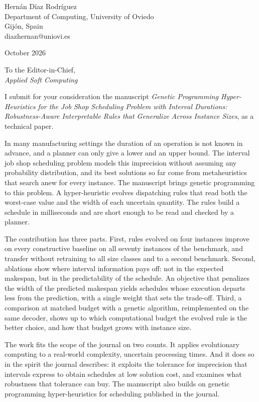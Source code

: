 \documentclass[11pt]{article}
\begin{document}
\noindent
Hern\'an D\'iaz Rodr\'iguez\\
Department of Computing, University of Oviedo\\
Gij\'on, Spain\\
diazhernan@uniovi.es

\vspace{1em}
 October 2026

\vspace{1em}
\noindent To the Editor-in-Chief,\\
\emph{Applied Soft Computing}

\vspace{1em}

I submit for your consideration the manuscript \emph{Genetic
Programming Hyper-Heuristics for the Job Shop Scheduling Problem with
Interval Durations: Robustness-Aware Interpretable Rules that Generalize
Across Instance Sizes}, as a technical paper.

In many manufacturing settings the duration of an operation is not
known in advance, and a planner can only give a lower and an upper
bound. The interval job shop scheduling problem models this imprecision
without assuming any probability distribution, and its best solutions
so far come from metaheuristics that search anew for every instance.
The manuscript brings genetic programming to this problem. A
hyper-heuristic evolves dispatching rules that read both the worst-case
value and the width of each uncertain quantity. The rules build a
schedule in milliseconds and are short enough to be read and checked by
a planner.

The contribution has three parts. First, rules evolved on four
instances improve on every constructive baseline on all seventy
instances of the benchmark, and transfer without retraining to all size
classes and to a second benchmark. Second, ablations show where interval
information pays off: not in the expected makespan, but in the
predictability of the schedule. An objective that penalizes the width of
the predicted makespan yields schedules whose execution departs less
from the prediction, with a single weight that sets the trade-off.
Third, a comparison at matched budget with a genetic algorithm,
reimplemented on the same decoder, shows up to which computational
budget the evolved rule is the better choice, and how that budget grows
with instance size.

The work fits the scope of the journal on two counts. It applies
evolutionary computing to a real-world complexity, uncertain processing
times. And it does so in the spirit the journal describes: it exploits
the tolerance for imprecision that intervals express to obtain
schedules at low solution cost, and examines what robustness that
tolerance can buy. The manuscript also builds on genetic programming
hyper-heuristics for scheduling published in the journal.
\end{document}
